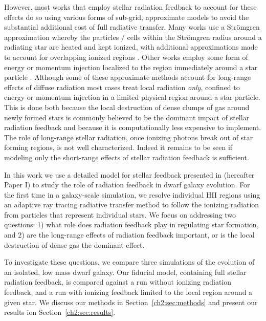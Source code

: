 However, most works that employ stellar radiation feedback to account for these effects do so using various forms of sub-grid, approximate models to avoid the substantial additional cost of full radiative transfer. Many works use a Str{\"o}mgren approximation whereby the particles / cells within the Str{\"o}mgren radius around a radiating star are heated and kept ionized, with additional approximations made to account for overlapping ionized regions \citep[e.g.][]{HQM2011,Hu2016,Hu2017}. Other works employ some form of energy or momentum injection localized to the region immediately around a star particle \citep[e.g.][]{Agertz2013,Roskar2014,Ceverino2014,Forbes2016}. Although some of these approximate methods account for long-range effects of diffuse radiation \citep{HQM2012,Hopkins2018} most cases treat local radiation {\it only}, confined to energy or momentum injection in a limited physical region around a star particle. This is done both because the local destruction of dense clumps of gas around newly formed stars is commonly believed to be the dominant impact of stellar radiation feedback and because it is computationally less expensive to implement. The role of long-range stellar radiation, once ionizing photons break out of star forming regions, is not well characterized. Indeed it remains to be seen if modeling only the short-range effects of stellar radiation feedback is sufficient.

In this work we use a detailed model for stellar feedback presented in \cite{Emerick2019} (hereafter Paper I) to study the role of radiation feedback in dwarf galaxy evolution. For the first time in a galaxy-scale simulation, we resolve individual HII regions using an adaptive ray tracing radiative transfer method to follow the ionizing radiation from particles that represent individual stars. We focus on addressing two questions: 1) what role does radiation feedback play in regulating star formation, and 2) are the long-range effects of radiation feedback important, or is the local destruction of dense gas the dominant effect.

To investigate these questions, we compare three simulations of the evolution of an isolated, low mass dwarf galaxy. Our fiducial model, containing full stellar radiation feedback, is compared against a run without ionizing radiation feedback, and a run with ionizing feedback limited to the local region around a given star. We discuss our methods in Section~\ref{ch2:sec:methods} and present our results ion Section~\ref{ch2:sec:results}.

